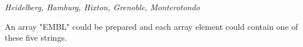 \textit{Heidelberg, Hamburg, Hixton, Grenoble, Monterotondo}

An array "EMBL" could be prepared and each array element could contain one of these five strings.